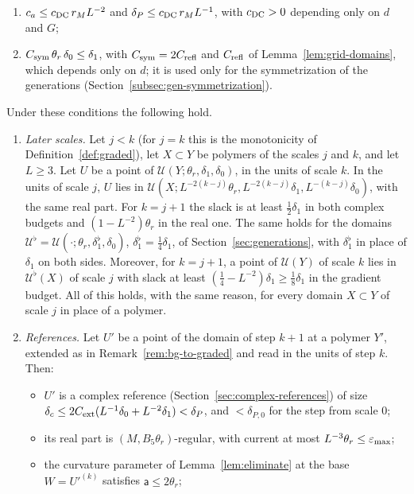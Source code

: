 \begin{remark}
\begin{itemize}
\begin{enumerate}[label=(DC\arabic*)]
\item $c_a\le c_{\rm DC}\,r_ML^{-2}$ and $\delta_P\le c_{\rm DC}\,r_ML^{-1}$, with $c_{\rm DC}>0$ depending only on $d$ and $G$;
\item $C_{\rm sym}\,\theta_r\,\delta_0\le\delta_1$, with $C_{\rm sym}=2C_{\rm refl}$ and $C_{\rm refl}$ of Lemma~\ref{lem:grid-domains}, which depends only on $d$; it is used only for the symmetrization of the generations (Section~\ref{subsec:gen-symmetrization}).
\end{enumerate}
\end{itemize}
Under these conditions the following hold.
\begin{enumerate}[label=(\roman*)]
\item \emph{Later scales.} Let $j<k$ (for $j=k$ this is the monotonicity of Definition~\ref{def:graded}), let $X\subset Y$ be polymers of the scales $j$ and $k$, and let $L\ge3$. Let $U$ be a point of $\mathcal U(Y;\theta_r,\delta_1,\delta_0)$, in the units of scale $k$. In the units of scale $j$, $U$ lies in $\mathcal U(X;L^{-2(k-j)}\theta_r,L^{-2(k-j)}\delta_1,L^{-(k-j)}\delta_0)$, with the same real part. For $k=j+1$ the slack is at least $\frac12\delta_1$ in both complex budgets and $(1-L^{-2})\theta_r$ in the real one. The same holds for the domains $\mathcal U^\flat=\mathcal U(\cdot;\theta_r,\delta_1^\flat,\delta_0)$, $\delta_1^\flat=\frac14\delta_1$, of Section~\ref{sec:generations}, with $\delta_1^\flat$ in place of $\delta_1$ on both sides. Moreover, for $k=j+1$, a point of $\mathcal U(Y)$ of scale $k$ lies in $\mathcal U^\flat(X)$ of scale $j$ with slack at least $(\frac14-L^{-2})\delta_1\ge\frac18\delta_1$ in the gradient budget. All of this holds, with the same reason, for every domain $X\subset Y$ of scale $j$ in place of a polymer.
\item \emph{References.} Let $U'$ be a point of the domain of step $k+1$ at a polymer $Y'$, extended as in Remark~\ref{rem:bg-to-graded} and read in the units of step $k$. Then:
  \begin{itemize}
  \item $U'$ is a complex reference (Section~\ref{sec:complex-references}) of size $\delta_c\le2C_{\rm ext}(L^{-1}\delta_0+L^{-2}\delta_1)<\delta_P$, and $<\delta_{P,0}$ for the step from scale $0$;
  \item its real part is $(M,B_5\theta_r)$-regular, with current at most $L^{-3}\theta_r\le\varepsilon_{\max}$;
  \item the curvature parameter of Lemma~\ref{lem:eliminate} at the base $W=U'^{(k)}$ satisfies $\mathsf a\le2\theta_r$;

\end{itemize}
\end{enumerate}
\end{remark}
